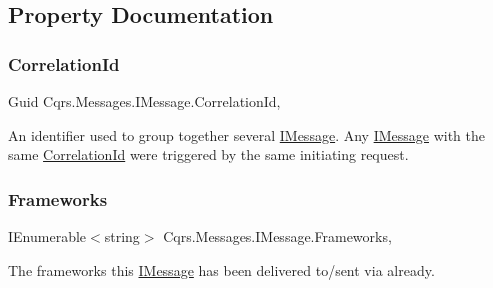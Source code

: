 \subsection{Property Documentation}
\mbox{\label{interfaceCqrs_1_1Messages_1_1IMessage_a9037d871a75ac76b190130aa56fe63a8_a9037d871a75ac76b190130aa56fe63a8}} 
\subsubsection{\texorpdfstring{Correlation\+Id}{CorrelationId}}
{\footnotesize\ttfamily Guid Cqrs.\+Messages.\+I\+Message.\+Correlation\+Id\hspace{0.3cm}{\ttfamily [get]}, {\ttfamily [set]}}



An identifier used to group together several \hyperlink{interfaceCqrs_1_1Messages_1_1IMessage}{I\+Message}. Any \hyperlink{interfaceCqrs_1_1Messages_1_1IMessage}{I\+Message} with the same \hyperlink{interfaceCqrs_1_1Messages_1_1IMessage_a9037d871a75ac76b190130aa56fe63a8_a9037d871a75ac76b190130aa56fe63a8}{Correlation\+Id} were triggered by the same initiating request. 

\mbox{\label{interfaceCqrs_1_1Messages_1_1IMessage_af147de5bb9a480ba75b5bb9f0ef12132_af147de5bb9a480ba75b5bb9f0ef12132}} 
\subsubsection{\texorpdfstring{Frameworks}{Frameworks}}
{\footnotesize\ttfamily I\+Enumerable$<$string$>$ Cqrs.\+Messages.\+I\+Message.\+Frameworks\hspace{0.3cm}{\ttfamily [get]}, {\ttfamily [set]}}



The frameworks this \hyperlink{interfaceCqrs_1_1Messages_1_1IMessage}{I\+Message} has been delivered to/sent via already. 

